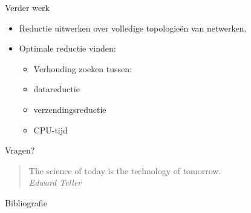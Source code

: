 \documentclass[presentation, bigger]{beamer}
\begin{document}
\begin{frame}{Verder werk}
  \begin{itemize}
  \item Reductie uitwerken over volledige topologieën van netwerken.
  \item Optimale reductie vinden:
   \begin{itemize}
        \item[] Verhouding zoeken tussen:
  		\item datareductie
  		\item verzendingsreductie
  		\item CPU-tijd
  		\end{itemize}
  \end{itemize}
\end{frame}

\begin{frame}{Vragen?}
\begin{quote}
The science of today is the technology of tomorrow.\\
\raggedleft \textit{Edward Teller}
\end{quote}
\end{frame}

\begin{frame}[allowframebreaks]{Bibliografie}

  \nocite{*}
  \printbibliography
\end{frame}
\end{document}
